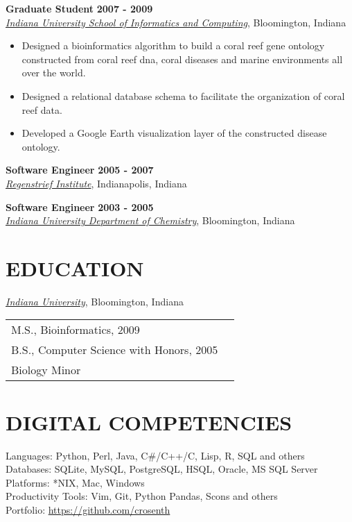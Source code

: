 \documentclass{res}
\begin{document}
\begin{resume}
\textbf{Graduate Student} \hfill \textbf{2007 - 2009}\\
\href{http://www.informatics.indiana.edu/}{\textit{Indiana University School of Informatics and Computing}}, Bloomington, Indiana
\begin{itemize} \itemsep -2pt
\item Designed a bioinformatics algorithm to build a coral reef gene ontology constructed from coral reef dna, coral diseases and marine environments all over the world.
\item Designed a relational database schema to facilitate the organization of coral reef data.
\item Developed a Google Earth visualization layer of the constructed disease ontology.
\end{itemize}

\textbf{Software Engineer} \hfill \textbf{2005 - 2007}\\
\href{http://www.regenstrief.org/}{\textit{Regenstrief Institute}}, Indianapolis, Indiana

\textbf{Software Engineer} \hfill \textbf{2003 - 2005}\\
\href{http://chem.indiana.edu/}{\textit{Indiana University Department of Chemistry}}, Bloomington, Indiana

\section{EDUCATION}
\href{http://www.iub.edu/}{\textit{Indiana University}}, Bloomington, Indiana\\
\begin{tabular}{p{10cm} l} 
M.S., Bioinformatics, 2009\\
B.S., Computer Science with Honors, 2005\\
Biology Minor
\end{tabular}

\section{DIGITAL COMPETENCIES} 
Languages: Python, Perl, Java, C\#/C++/C, Lisp, R, SQL and others\\
Databases: SQLite, MySQL, PostgreSQL, HSQL, Oracle, MS SQL Server\\
Platforms: *NIX, Mac, Windows\\
Productivity Tools: Vim, Git, Python Pandas, Scons and others\\
Portfolio: \url{https://github.com/crosenth}


\end{resume}
\end{document}
